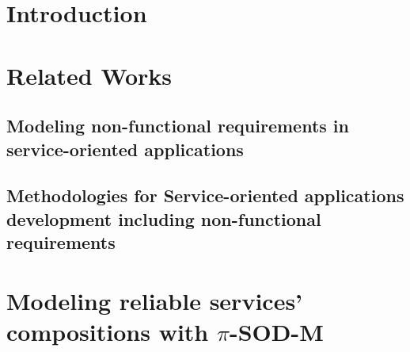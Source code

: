 \documentclass[preprint,12pt]{elsarticle}
\begin{document}

\section{Introduction}
\label{sec:intro}


\section{Related Works}
\label{sec:relworks}


\subsection{Modeling non-functional requirements in service-oriented applications}
\label{sec:modeling}


\subsection{Methodologies for Service-oriented applications development including non-functional requirements}
\label{sec:methodologies}



\section{Modeling reliable services' compositions with $\pi$-SOD-M}\label{sec:motivation}

\end{document}

